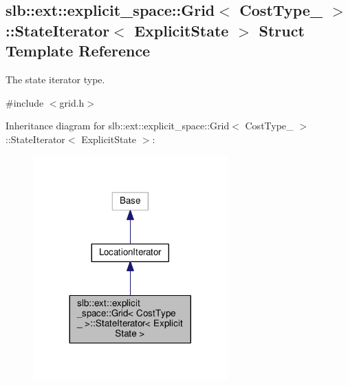 \hypertarget{structslb_1_1ext_1_1explicit__space_1_1Grid_1_1StateIterator}{}\subsection{slb\+:\+:ext\+:\+:explicit\+\_\+space\+:\+:Grid$<$ Cost\+Type\+\_\+ $>$\+:\+:State\+Iterator$<$ Explicit\+State $>$ Struct Template Reference}
\label{structslb_1_1ext_1_1explicit__space_1_1Grid_1_1StateIterator}


The state iterator type.  




{\ttfamily \#include $<$grid.\+h$>$}



Inheritance diagram for slb\+:\+:ext\+:\+:explicit\+\_\+space\+:\+:Grid$<$ Cost\+Type\+\_\+ $>$\+:\+:State\+Iterator$<$ Explicit\+State $>$\+:\nopagebreak
\begin{figure}[H]
\begin{center}
\leavevmode
\includegraphics[width=212pt]{structslb_1_1ext_1_1explicit__space_1_1Grid_1_1StateIterator__inherit__graph}
\end{center}
\end{figure}


